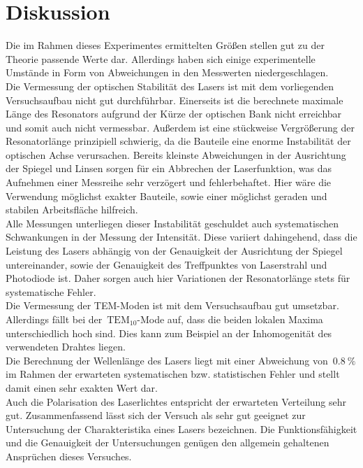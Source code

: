 \section{Diskussion}
\label{sec:diskussion}
%
Die im Rahmen dieses Experimentes ermittelten Größen stellen gut zu der Theorie
passende Werte dar. Allerdings haben sich einige experimentelle Umstände in Form
von Abweichungen in den Messwerten niedergeschlagen. \\
Die Vermessung der optischen Stabilität des Lasers ist mit dem vorliegenden
Versuchsaufbau nicht gut durchführbar. Einerseits ist die berechnete maximale
Länge des Resonators aufgrund der Kürze der optischen Bank nicht erreichbar und
somit auch nicht vermessbar. Außerdem ist eine stückweise Vergrößerung der
Resonatorlänge prinzipiell schwierig, da die Bauteile eine enorme Instabilität
der optischen Achse verursachen. Bereits kleinste Abweichungen in der
Ausrichtung der Spiegel und Linsen sorgen für ein Abbrechen der Laserfunktion,
was das Aufnehmen einer Messreihe sehr verzögert und fehlerbehaftet. Hier wäre
die Verwendung möglichst exakter Bauteile, sowie einer möglichst geraden und
stabilen Arbeitsfläche hilfreich. \\
Alle Messungen unterliegen dieser Instabilität geschuldet auch systematischen
Schwankungen in der Messung der Intensität. Diese variiert dahingehend, dass
die Leistung des Lasers abhängig von der Genauigkeit der Ausrichtung der Spiegel
untereinander, sowie der Genauigkeit des Treffpunktes von Laserstrahl und
Photodiode ist. Daher sorgen auch hier Variationen der Resonatorlänge stets für
systematische Fehler. \\
Die Vermessung der TEM-Moden ist mit dem Versuchsaufbau gut umsetzbar.
Allerdings fällt bei der~$\text{TEM}_{10}$-Mode auf, dass die beiden lokalen
Maxima unterschiedlich hoch sind. Dies kann zum Beispiel an der Inhomogenität
des verwendeten Drahtes liegen. \\
Die Berechnung der Wellenlänge des Lasers liegt mit einer Abweichung
von~$\SI{0.8}{\percent}$ im Rahmen der erwarteten systematischen bzw.
statistischen Fehler und stellt damit einen sehr exakten Wert dar. \\
Auch die Polarisation des Laserlichtes entspricht der erwarteten Verteilung sehr
gut. Zusammenfassend lässt sich der Versuch als sehr gut geeignet zur
Untersuchung der Charakteristika eines Lasers bezeichnen. Die Funktionsfähigkeit
und die Genauigkeit der Untersuchungen genügen den allgemein gehaltenen
Ansprüchen dieses Versuches.
